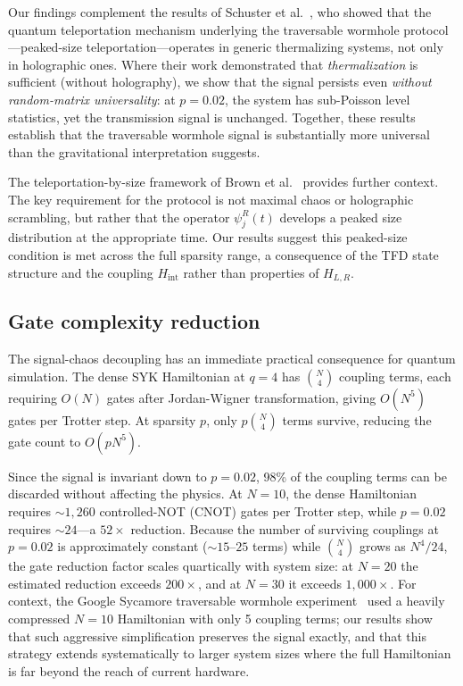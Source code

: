 \documentclass[aps,prd,twocolumn,superscriptaddress,nofootinbib,floatfix]{revtex4-2}
\begin{document}
Our findings complement the results of Schuster et
al.~\cite{Schuster:2021uvg}, who showed that the quantum teleportation
mechanism underlying the traversable wormhole protocol---peaked-size
teleportation---operates in generic thermalizing systems, not only in
holographic ones. Where their work demonstrated that \textit{thermalization}
is sufficient (without holography), we show that the signal persists even
\textit{without random-matrix universality}: at $p=0.02$, the system has
sub-Poisson level statistics, yet the transmission signal is unchanged. Together, these results establish that the traversable
wormhole signal is substantially more universal than the gravitational
interpretation suggests.

The teleportation-by-size framework of Brown et al.~\cite{Brown:2019hmk}
provides further context. The key requirement for the protocol is not
maximal chaos or holographic scrambling, but rather that the operator
$\psi_j^R(t)$ develops a peaked size distribution at the appropriate time.
Our results suggest this peaked-size condition is met across the full
sparsity range, a consequence of the TFD state structure and the coupling
$H_\mathrm{int}$ rather than properties of $H_{L,R}$.

\subsection{Gate complexity reduction}
\label{sec:gates}

The signal-chaos decoupling has an immediate practical consequence for quantum
simulation. The dense SYK Hamiltonian at $q=4$ has $\binom{N}{4}$ coupling
terms, each requiring $O(N)$ gates after Jordan-Wigner transformation,
giving $O(N^5)$ gates per Trotter step. At sparsity $p$, only
$p\binom{N}{4}$ terms survive, reducing the gate count to $O(pN^5)$.

Since the signal is invariant down to $p=0.02$, 98\% of the coupling terms
can be discarded without affecting the physics. At $N=10$, the dense
Hamiltonian requires ${\sim}1{,}260$ controlled-NOT (CNOT) gates per Trotter
step, while $p=0.02$ requires ${\sim}24$---a $52\times$ reduction. Because
the number of surviving couplings at $p=0.02$ is approximately constant
(${\sim}15$--$25$ terms) while $\binom{N}{4}$ grows as $N^4/24$, the gate
reduction factor scales quartically with system size: at $N=20$ the
estimated reduction exceeds $200\times$, and at $N=30$ it exceeds
$1{,}000\times$. For context, the Google Sycamore traversable wormhole
experiment~\cite{Jafferis:2022uhu} used a heavily compressed $N=10$
Hamiltonian with only 5 coupling terms; our results show that such
aggressive simplification preserves the signal exactly, and that this
strategy extends systematically to larger system sizes where the full
Hamiltonian is far beyond the reach of current hardware.
\end{document}
